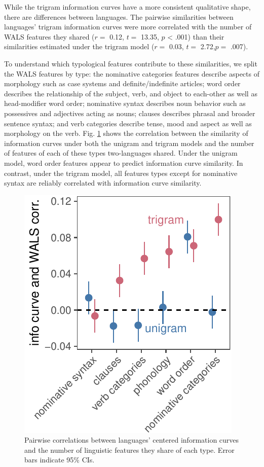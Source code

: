 \documentclass[10pt, letterpaper]{article}
\newenvironment{CodeChunk}{}{}
\begin{document}
While the trigram information curves have a more consistent qualitative
shape, there are differences between languages. The pairwise
similarities between languages' trigram information curves were more
correlated with the number of WALS features they shared (\(r =\) 0.12,
\(t =\) 13.35, \(p\) \textless{} .001) than their similarities estimated
under the trigram model (\(r =\) 0.03, \(t =\) 2.72,\(p =\) .007).

To understand which typological features contribute to these
similarities, we split the WALS features by type: the nominative
categories features describe aspects of morphology such as case systems
and definite/indefinite articles; word order describes the relationship
of the subject, verb, and object to each-other as well as head-modifier
word order; nominative syntax describes noun behavior such as
possessives and adjectives acting as nouns; clauses describes phrasal
and broader sentence syntax; and verb categories describe tense, mood
and aspect as well as morphology on the verb. Fig. \ref{fig:type_cors}
shows the correlation between the similarity of information curves under
both the unigram and trigram models and the number of features of each
of these types two-languages shared. Under the unigram model, word order
features appear to predict information curve similarity. In contrast,
under the trigram model, all features types except for nominative syntax
are reliably correlated with information curve similarity.

\begin{CodeChunk}
\begin{figure}[tb]
\includegraphics{figs/type_cors-1} \caption[Pairwise correlations between languages' centered information curves and the number of linguistic features they share of each type]{Pairwise correlations between languages' centered information curves and the number of linguistic features they share of each type. Error bars indicate 95\% CIs.}\label{fig:type_cors}
\end{figure}
\end{CodeChunk}
\end{document}
